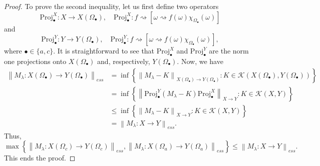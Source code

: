 \documentclass[10pt,a4paper]{amsart}
\newcommand{\norm}[1]{\left\lVert#1\right\rVert}
\begin{document}
\begin{proof}
	To prove the second inequality, let us first define two operators
	\begin{equation*}
		\text{Proj}_{\bullet}^X \colon X \rightarrow X(\Omega_{\bullet}), \quad
		\text{Proj}_{\bullet}^X \colon f \rightsquigarrow \left[ \omega \rightsquigarrow f(\omega)\chi_{\Omega_{\bullet}}(\omega) \right]
	\end{equation*}
	and
	\begin{equation*}
		\text{Proj}_{\bullet}^Y \colon Y \rightarrow Y(\Omega_{\bullet}), \quad
		\text{Proj}_{\bullet}^Y \colon f \rightsquigarrow \left[ \omega \rightsquigarrow f(\omega)\chi_{\Omega_{\bullet}}(\omega) \right],
	\end{equation*}
	where $\bullet \in \{a, c\}$.
	It is straightforward to see that $\text{Proj}_{\bullet}^X$ and $\text{Proj}_{\bullet}^Y$ are the norm one projections
	onto $X(\Omega_{\bullet})$ and, respectively, $Y(\Omega_{\bullet})$.
	Now, we have
	\begin{align*}
		\norm{M_{\lambda} \colon X(\Omega_{\bullet}) \rightarrow Y(\Omega_{\bullet})}_{ess}
			& = \inf \left\{ \norm{M_{\lambda} - K}_{X(\Omega_{\bullet}) \rightarrow Y(\Omega_{\bullet})} \colon K \in \mathscr{K}(X(\Omega_{\bullet}),Y(\Omega_{\bullet})) \right\} \\
			& = \inf \left\{ \norm{\text{Proj}_{\bullet}^Y(M_{\lambda} - K)\text{Proj}_{\bullet}^X}_{X \rightarrow Y} \colon K \in \mathscr{K}(X,Y) \right\} \\
			& \leqslant \inf \left\{ \norm{M_{\lambda} - K}_{X \rightarrow Y} \colon K \in \mathscr{K}(X,Y) \right\} \\
			& = \norm{M_{\lambda} \colon X \rightarrow Y}_{ess}.
	\end{align*}
	Thus,
	\begin{equation*}
		\max \left\{ \norm{M_{\lambda} \colon X(\Omega_c) \rightarrow Y(\Omega_c)}_{ess}, \norm{M_{\lambda} \colon X(\Omega_a) \rightarrow Y(\Omega_a)}_{ess} \right\}
			\leqslant \norm{M_{\lambda} \colon X \rightarrow Y}_{ess}.
	\end{equation*}
	This ends the proof.
\end{proof}
\end{document}
